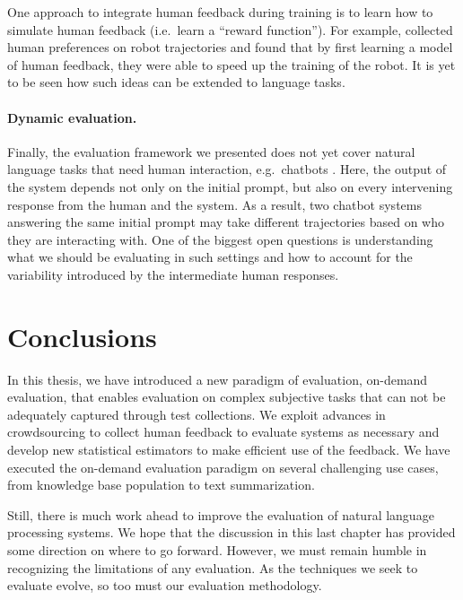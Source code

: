 One approach to integrate human feedback during training is to learn how to simulate human feedback (i.e.\ learn a ``reward function'').
For example, \citet{christiano2017deep} collected human preferences on robot trajectories and found that by first learning a model of human feedback, they were able to speed up the training of the robot.
It is yet to be seen how such ideas can be extended to language tasks.

\paragraph{Dynamic evaluation.}
Finally, the evaluation framework we presented does not yet cover natural language tasks that need human interaction, e.g.\ chatbots . 
Here, the output of the system depends not only on the initial prompt, but also on every intervening response from the human and the system.
As a result, two chatbot systems answering the same initial prompt may take different trajectories based on who they are interacting with.
One of the biggest open questions is understanding what we should be evaluating in such settings and how to account for the variability introduced by the intermediate human responses.

\section{Conclusions}
In this thesis, we have introduced a new paradigm of evaluation, on-demand evaluation, that enables evaluation on complex subjective  tasks that can not be adequately captured through test collections.
We exploit  advances in crowdsourcing to collect human feedback to evaluate systems as necessary and develop new statistical estimators to make efficient use of the feedback.
We have executed the on-demand evaluation paradigm on several challenging use cases, from knowledge base population to text summarization.

Still, there is much work ahead to improve the evaluation of natural language processing systems.
We hope that the discussion in this last chapter has provided some direction on where to go forward.
However, we must remain humble in recognizing the limitations of any evaluation.
As the techniques we seek to evaluate evolve, so too must our evaluation methodology.

